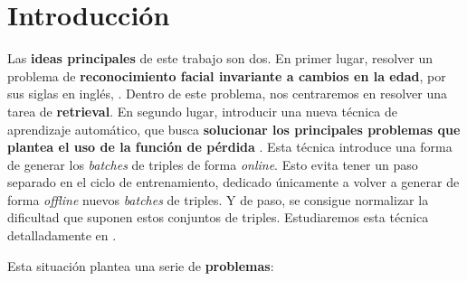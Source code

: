 
%

\chapter{Introducción} \label{ich:introduccion}

Las \textbf{ideas principales} de este trabajo son dos. En primer lugar, resolver un problema de \textbf{reconocimiento facial invariante a cambios en la edad}, por sus siglas en inglés, . Dentro de este problema, nos centraremos en resolver una tarea de \textbf{retrieval}. En segundo lugar, introducir una nueva técnica de aprendizaje automático, que busca \textbf{solucionar los principales problemas que plantea el uso de la función de pérdida } \cite{informatica:principal}. Esta técnica introduce una forma de generar los \textit{batches} de triples de forma \textit{online}. Esto evita tener un paso separado en el ciclo de entrenamiento, dedicado únicamente a volver a generar de forma \textit{offline} nuevos \textit{batches} de triples. Y de paso, se consigue normalizar la dificultad que suponen estos conjuntos de triples. Estudiaremos esta técnica detalladamente en .

Esta situación plantea una serie de \textbf{problemas}:

